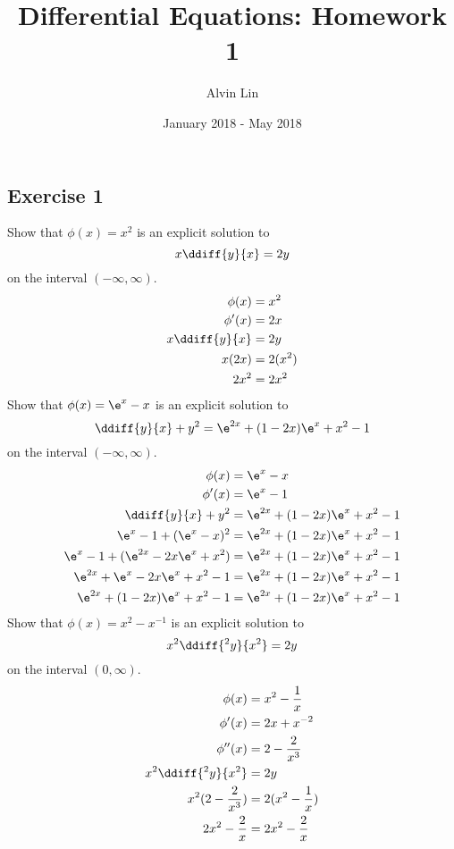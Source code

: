 \documentclass{math}
\title{Differential Equations: Homework 1}
\author{Alvin Lin}
\date{January 2018 - May 2018}
\begin{document}
\maketitle
\clearpage

\subsection*{Exercise 1}
Show that \( \phi(x) = x^2 \) is an explicit solution to
\[ x\ddiff{y}{x} = 2y \]
on the interval \( (-\infty,\infty) \).
\begin{align*}
  \phi(x) &= x^2 \\
  \phi'(x) &= 2x \\
  x\ddiff{y}{x} &= 2y \\
  x(2x) &= 2(x^2) \\
  2x^2 &= 2x^2
\end{align*}
Show that \( \phi(x) = \e^x-x \) is an explicit solution to
\[ \ddiff{y}{x}+y^2 = \e^{2x}+(1-2x)\e^x+x^2-1 \]
on the interval \( (-\infty,\infty) \).
\begin{align*}
  \phi(x) &= \e^x-x \\
  \phi'(x) &= \e^x-1 \\
  \ddiff{y}{x}+y^2 &= \e^{2x}+(1-2x)\e^x+x^2-1 \\
  \e^x-1+(\e^x-x)^2 &= \e^{2x}+(1-2x)\e^x+x^2-1 \\
  \e^x-1+(\e^{2x}-2x\e^x+x^2) &= \e^{2x}+(1-2x)\e^x+x^2-1 \\
  \e^{2x}+\e^x-2x\e^x+x^2-1 &= \e^{2x}+(1-2x)\e^x+x^2-1 \\
  \e^{2x}+(1-2x)\e^x+x^2-1 &= \e^{2x}+(1-2x)\e^x+x^2-1
\end{align*}
Show that \( \phi(x) = x^2-x^{-1} \) is an explicit solution to
\[ x^2\ddiff{^2y}{x^2} = 2y \]
on the interval \( (0,\infty) \).
\begin{align*}
  \phi(x) &= x^2-\frac{1}{x} \\
  \phi'(x) &= 2x+x^{-2} \\
  \phi''(x) &= 2-\frac{2}{x^3} \\
  x^2\ddiff{^2y}{x^2} &= 2y \\
  x^2(2-\frac{2}{x^3}) &= 2(x^2-\frac{1}{x}) \\
  2x^2-\frac{2}{x} &= 2x^2-\frac{2}{x}
\end{align*}
\end{document}
